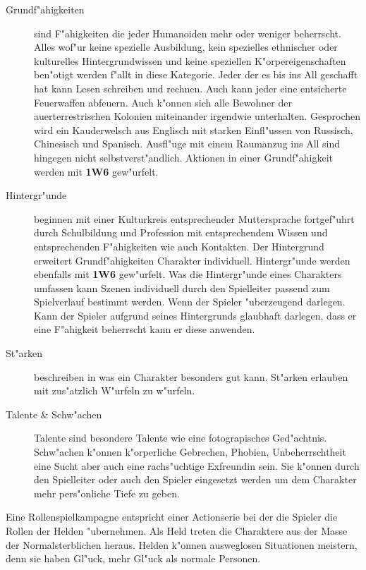 \begin{description}
    \item[Grundf"ahigkeiten] sind F"ahigkeiten die jeder Humanoiden mehr oder weniger beherrscht. Alles wof"ur keine spezielle Ausbildung,  
        kein spezielles ethnischer oder kulturelles Hintergrundwissen und keine speziellen K"orpereigenschaften ben"otigt werden f"allt in diese Kategorie. Jeder der es bis ins All geschafft hat kann Lesen schreiben und rechnen. Auch kann jeder eine entsicherte Feuerwaffen abfeuern. Auch k"onnen sich alle Bewohner der au\3erterrestrischen Kolonien miteinander irgendwie unterhalten. Gesprochen wird ein Kauderwelsch aus Englisch mit starken Einfl"ussen von Russisch, Chinesisch und Spanisch. Ausfl"uge mit einem Raumanzug ins All sind hingegen nicht selbstverst"andlich.  Aktionen in einer Grundf"ahigkeit werden mit \textbf{1W6} gew"urfelt. 
    \item[Hintergr"unde] beginnen mit einer Kulturkreis entsprechender Muttersprache fortgef"uhrt durch Schulbildung und Profession mit 
        entsprechendem Wissen und entsprechenden F"ahigkeiten wie auch Kontakten. Der Hintergrund erweitert Grundf"ahigkeiten Charakter individuell. Hintergr"unde werden ebenfalls mit \textbf{1W6} gew"urfelt. Was die Hintergr"unde eines Charakters umfassen kann Szenen individuell durch den Spielleiter passend zum Spielverlauf bestimmt werden. Wenn der Spieler "uberzeugend darlegen. Kann der Spieler aufgrund seines Hintergrunds glaubhaft darlegen, dass er eine F"ahigkeit beherrscht kann er diese anwenden.
    \item[St"arken] beschreiben in was ein Charakter besonders gut kann. St"arken erlauben mit zus"atzlich W"urfeln zu w"urfeln. 
    \item[Talente \& Schw"achen] Talente sind besondere Talente wie eine fotograpisches Ged"achtnis. Schw"achen k"onnen k"orperliche  
        Gebrechen, Phobien, Unbeherrschtheit eine Sucht aber auch eine rachs"uchtige Exfreundin sein. Sie k"onnen durch den Spielleiter oder auch den Spieler eingesetzt werden um dem Charakter mehr pers"onliche Tiefe zu geben.
\end{description}        


Eine Rollenspielkampagne entspricht einer Actionserie bei der die Spieler die Rollen der Helden "ubernehmen. Als Held treten die Charaktere aus der Masse der Normalsterblichen heraus. Helden k"onnen ausweglosen Situationen meistern, denn sie haben Gl"uck, mehr Gl"uck als normale Personen. 

